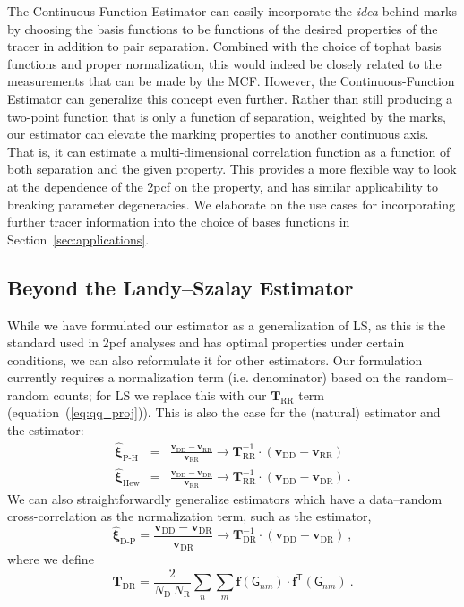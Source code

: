 \documentclass[modern]{aastex62}
\newcommand{\cf}{2pcf\xspace}
\newcommand{\Est}{The Continuous-Function Estimator\xspace}
\newcommand{\est}{the Continuous-Function Estimator\xspace}
\newcommand{\LS}{LS\xspace}
\newcommand{\eqt}[1]{equation~(\ref{#1})}
\newcommand{\inv}{^{-1}}
\newcommand{\T}{^{\mathsf{T}}}
\newcommand{\bld}[1]{\bm{#1}}
\newcommand{\vv}[1]{\bld{v}_\mathrm{#1}}
\newcommand{\TT}[1]{\bld{T}_\mathrm{#1}}
\newcommand{\ff}{\bld{f}}
\newcommand{\NN}[1]{N_\mathrm{#1}}
\newcommand{\GG}[1]{\mathsf{G}_{#1}}
\begin{document}
\Est can easily incorporate the \textit{idea} behind marks by choosing the basis functions to be functions of the desired properties of the tracer in addition to pair separation.
Combined with the choice of tophat basis functions and proper normalization, this would indeed be closely related to the measurements that can be made by the MCF.
However, \est can generalize this concept even further. 
Rather than still producing a two-point function that is only a function of separation, weighted by the marks, our estimator can elevate the marking properties to another continuous axis.
That is, it can estimate a multi-dimensional correlation function as a function of both separation and the given property.
This provides a more flexible way to look at the dependence of the \cf on the property, and has similar applicability to breaking parameter degeneracies.
We elaborate on the use cases for incorporating further tracer information into the choice of bases functions in Section~\ref{sec:applications}.

\subsection{Beyond the Landy--Szalay Estimator}
\label{sec:beyondls}

While we have formulated our estimator as a generalization of \LS, as this is the standard used in \cf analyses and has optimal properties under certain conditions, we can also reformulate it for other estimators.
Our formulation currently requires a normalization term (i.e. denominator) based on the random--random counts; for \LS we replace this with our $\TT{RR}$ term (\eqt{eq:qq_proj}).
This is also the case for the \cite{PeeblesHauser1974} (natural) estimator and the \cite{Hewett1982} estimator:
\begin{eqnarray}
    \bld{\hat{\xi}}_\text{P-H} &=& \frac{\vv{DD} - \vv{RR}}{\vv{RR}} \rightarrow \TT{RR}\inv \cdot \left( \vv{DD} - \vv{RR} \right)\\
    \bld{\hat{\xi}}_\text{Hew} &=& \frac{\vv{DD} - \vv{DR}}{\vv{RR}} \rightarrow \TT{RR}\inv \cdot \left( \vv{DD} - \vv{DR} \right) ~.
\end{eqnarray}
We can also straightforwardly generalize estimators which have a data--random cross-correlation as the normalization term, such as the \cite{DavisPeebles1983} estimator,
\begin{equation}
    \bld{\hat{\xi}}_\text{D-P} = \frac{\vv{DD} - \vv{DR}}{\vv{DR}} \rightarrow \TT{DR}\inv \cdot \left( \vv{DD} - \vv{DR} \right) ~,
\end{equation}
where we define
\begin{equation}
    \TT{DR} = \frac{2}{\NN{D}\,\NN{R}} \sum_{n} \sum_{m} \ff(\GG{n m}) \cdot \ff\T(\GG{n m}) ~.
\end{equation}
\end{document}
